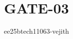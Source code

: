 \documentclass[journal]{IEEEtran}
\begin{document}

\vspace{3cm}

\title{GATE-03}
\author{ee25btech11063-vejith}


\maketitle
{\let\newpage\relax\maketitle}

\renewcommand{\thefigure}{\theenumi}
\renewcommand{\thetable}{\theenumi}
\setlength{\intextsep}{10pt} %
\end{document}
